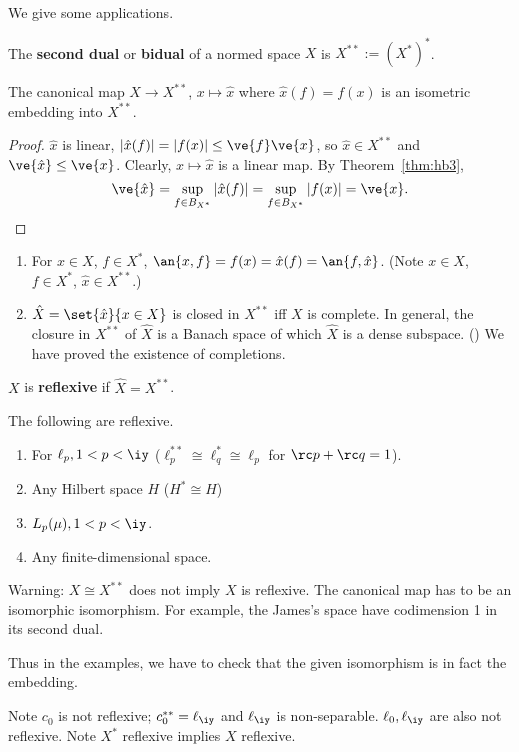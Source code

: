 We give some applications. 
\begin{df}
The \textbf{second dual} or \textbf{bidual} of a normed space $X$ is $X^{**}:=(X^*)^*$.
\end{df}
\begin{thm}
The canonical map $X\to X^{**}$, $x\mapsto \hat x$ where $\hat x(f)=f(x)$ is an isometric embedding into $X^{**}$. 
\end{thm}
\begin{proof}
$\hat x$ is linear, $|\hat x(f)|=|f(x)|\le \ve{f}\ve{x}$, so $\hat x\in X^{**}$ and $\ve{\hat x}\le \ve{x}$. Clearly, $x\mapsto \hat x$ is a linear map. By Theorem~\ref{thm:hb3}, 
\[\ve{\hat x}=\sup_{f\in B_{X^*}}|\hat x(f)|=\sup_{f\in B_{X^*}}|f(x)|=\ve{x}.\]
\end{proof}
\begin{rem}
\begin{enumerate}
\item
For $x\in X$, $f\in X^*$, $\an{x,f}=f(x)=\hat x(f)=\an{f,\hat x}$. (Note $x\in X$, $f\in X^*$, $\hat x\in X^{**}$.)
\item
$\hat X=\set{\hat x}{x\in X}$ is closed in $X^{**}$ iff $X$ is complete. In general, the closure in $X^{**}$ of $\hat X$ is a Banach space of which $\hat X$ is a dense subspace. () We have proved the existence of completions.
\end{enumerate}
\end{rem}
\begin{df}
$X$ is \textbf{reflexive} if $\hat X=X^{**}$. 
\end{df}
\begin{ex}
The following are reflexive.
\begin{enumerate}
\item
For $\ell_p,1<p<\iy$ ($\ell_p^{**}\cong \ell_q^*\cong \ell_p$ for $\rc p+\rc q=1$).
\item
Any Hilbert space $H$ ($H^*\cong H$)
\item $L_p(\mu), 1<p<\iy$.
\item
Any finite-dimensional space.
\end{enumerate}
Warning: $X\cong X^{**}$ does not imply $X$ is reflexive. The canonical map has to be an isomorphic isomorphism. For example, the James's space have codimension 1 in its second dual.

Thus in the examples, we have to check that the given isomorphism is in fact the embedding.

Note $c_0$ is not reflexive; $c_0^{**}=\ell_{\iy}$ and $\ell_{\iy}$ is non-separable. $\ell_0,\ell_{\iy}$ are also not reflexive. Note $X^*$ reflexive implies $X$ reflexive.
\end{ex}

